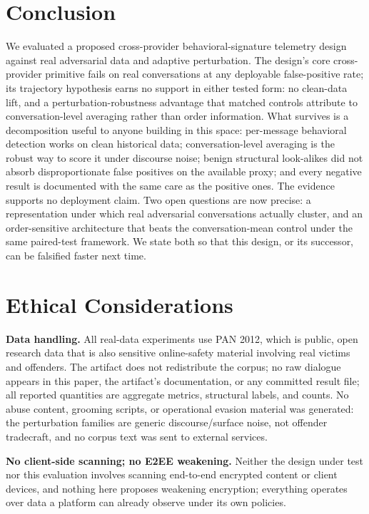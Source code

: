 \documentclass[letterpaper,twocolumn,10pt]{article}
\begin{document}
\section{Conclusion}
\label{sec:conclusion}
We evaluated a proposed cross-provider behavioral-signature telemetry design
against real adversarial data and adaptive perturbation. The design's core
cross-provider primitive fails on real conversations at any deployable
false-positive rate; its trajectory hypothesis earns no support in either
tested form: no clean-data lift, and a perturbation-robustness advantage
that matched controls attribute to conversation-level averaging rather than
order information. What survives is a decomposition useful to anyone
building in this space: per-message behavioral detection works on clean
historical data; conversation-level averaging is the robust way to score it
under discourse noise; benign structural look-alikes did not absorb
disproportionate false positives on the available proxy; and every negative
result is documented with the same care as the positive ones. The evidence
supports no deployment claim. Two open questions are now precise: a
representation under which real adversarial conversations actually cluster,
and an order-sensitive architecture that beats the conversation-mean control
under the same paired-test framework. We state both so that this design, or
its successor, can be falsified faster next time.

\section{Ethical Considerations}
\label{sec:ethics}

\textbf{Data handling.} All real-data experiments use PAN 2012, which is
public, open research data that is also sensitive online-safety material
involving real victims and offenders. The artifact does not redistribute the corpus;
no raw dialogue appears in this paper, the artifact's documentation, or any
committed result file; all reported quantities are aggregate metrics,
structural labels, and counts. No abuse content, grooming scripts, or
operational evasion material was generated: the perturbation families are
generic discourse/surface noise, not offender tradecraft, and no corpus text
was sent to external services.

\textbf{No client-side scanning; no E2EE weakening.} Neither the design
under test nor this evaluation involves scanning end-to-end encrypted
content or client devices, and nothing here proposes weakening encryption;
everything operates over data a platform can already observe under its own
policies.
\end{document}
